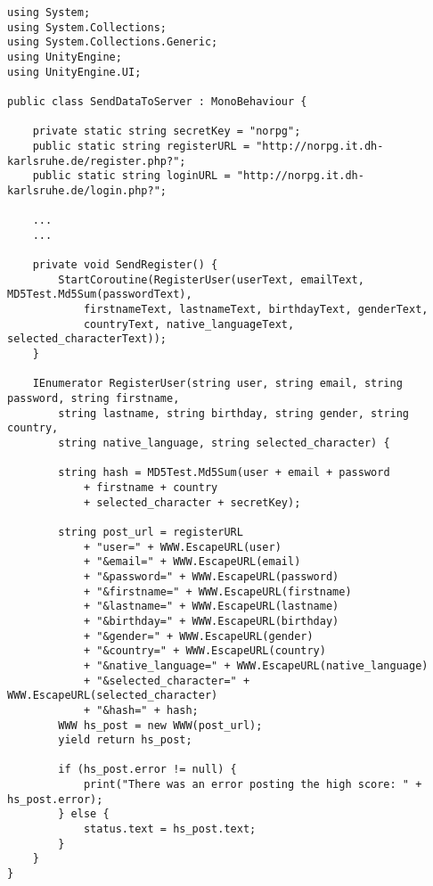 \begin{scriptsize}
\lstset{
	float,
	caption=Skript SendDataToServer.cs, 
	language=[Sharp]C, 
	frame=single,  
	showstringspaces=false, 
	showspaces=false, 
	numbers=left, 
	captionpos=b, 
	belowcaptionskip=4pt,
	basicstyle=\ttfamily
} 
\newpage
\begin{lstlisting}[label=lst:c_SendDataToServer]
using System;
using System.Collections;
using System.Collections.Generic;
using UnityEngine;
using UnityEngine.UI;

public class SendDataToServer : MonoBehaviour {

    private static string secretKey = "norpg";
    public static string registerURL = "http://norpg.it.dh-karlsruhe.de/register.php?";
    public static string loginURL = "http://norpg.it.dh-karlsruhe.de/login.php?";

	...
	...

    private void SendRegister() {
        StartCoroutine(RegisterUser(userText, emailText, MD5Test.Md5Sum(passwordText), 
        	firstnameText, lastnameText, birthdayText, genderText, 
        	countryText, native_languageText, selected_characterText));
    }

    IEnumerator RegisterUser(string user, string email, string password, string firstname, 
    	string lastname, string birthday, string gender, string country, 
    	string native_language, string selected_character) {

        string hash = MD5Test.Md5Sum(user + email + password 
        	+ firstname + country 
        	+ selected_character + secretKey);

        string post_url = registerURL
            + "user=" + WWW.EscapeURL(user)
            + "&email=" + WWW.EscapeURL(email)
            + "&password=" + WWW.EscapeURL(password)
            + "&firstname=" + WWW.EscapeURL(firstname)
            + "&lastname=" + WWW.EscapeURL(lastname)
            + "&birthday=" + WWW.EscapeURL(birthday)
            + "&gender=" + WWW.EscapeURL(gender)
            + "&country=" + WWW.EscapeURL(country)
            + "&native_language=" + WWW.EscapeURL(native_language)
            + "&selected_character=" + WWW.EscapeURL(selected_character)
            + "&hash=" + hash;
        WWW hs_post = new WWW(post_url);
        yield return hs_post;

        if (hs_post.error != null) {
            print("There was an error posting the high score: " + hs_post.error);
        } else {
            status.text = hs_post.text;
        }
    }
}

\end{lstlisting}
\end{scriptsize}

